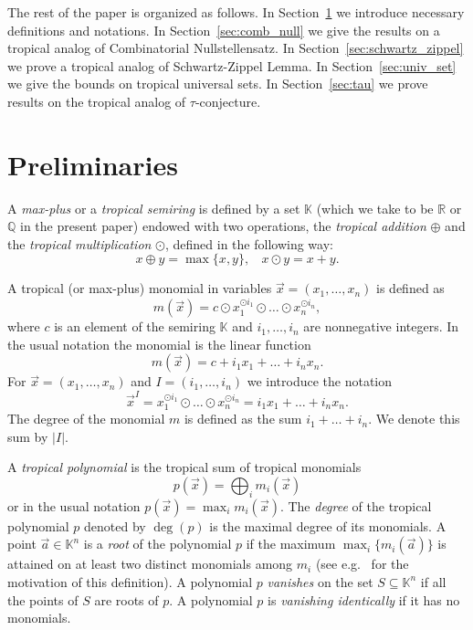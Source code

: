 \documentclass[11pt]{article}
\newcommand{\ta}{\oplus}
\newcommand{\tp}{\odot}
\newcommand{\bb}[1]{\mathbb{#1}}
\begin{document}

The rest of the paper is organized as follows. 
In Section~\ref{sec:prelim} we introduce necessary definitions and notations. 
In Section~\ref{sec:comb_null} we give the results on a tropical analog of Combinatorial Nullstellensatz.
In Section~\ref{sec:schwartz_zippel} we prove a tropical analog of Schwartz-Zippel Lemma. 
In Section~\ref{sec:univ_set} we give the bounds on tropical universal sets. 
In Section~\ref{sec:tau} we prove results on the tropical analog of $\tau$-conjecture.
\section{Preliminaries} \label{sec:prelim}

A \emph{max-plus} or a \emph{tropical semiring} is defined by a set $\bb{K}$ (which we take to be $\mathbb{R}$ or
$\mathbb{Q}$ in the present paper) 
endowed with two operations, the \emph{tropical addition} $\ta$ and the \emph{tropical multiplication} $\tp$, defined in
the following way:
$$
x \ta y = \max\{x,y\}, \ \ \ \ x \tp y = x + y.
$$


A tropical (or max-plus) monomial in variables $\vec{x} = (x_1, \ldots, x_n)$ is defined as
\begin{equation} \label{eq:monomial}
m(\vec{x}) = c \tp x_1^{\tp i_1} \tp \ldots \tp x_n^{\tp i_n},
\end{equation}
where $c$ is an element of the semiring $\bb{K}$ and $i_1, \ldots, i_n$ are nonnegative integers.
In the usual notation the monomial is the linear function
$$
m(\vec{x}) = c + i_1 x_1 + \ldots + i_n x_n.
$$
For $\vec{x} = (x_1, \ldots, x_n)$ and $I = (i_1, \ldots, i_n)$
we introduce the notation
$$
\vec{x}^I = x_1^{\tp i_1} \tp \ldots \tp x_n^{\tp i_n} = i_1 x_1 + \ldots + i_n x_n.
$$
The degree of the monomial $m$ is defined as the sum $i_1 + \ldots + i_n$. We denote this sum by $|I|$.

A \emph{tropical polynomial} is the tropical sum of tropical monomials
$$
p(\vec{x}) = \bigoplus_i m_i(\vec{x})
$$
or in the usual notation $p(\vec{x}) = \max_i m_i(\vec{x})$.
The \emph{degree} of the tropical polynomial $p$ denoted by $\deg(p)$ is the maximal degree of its monomials.
A point $\vec{a} \in \bb{K}^n$ is a \emph{root} of the polynomial $p$ if the maximum $\max_i\{m_i(\vec{a})\}$
is attained on at least two distinct monomials among $m_i$ (see e.g.~\cite{RGST05first_steps} for the motivation of this definition). 
A polynomial $p$ \emph{vanishes} on the set $S \subseteq \bb{K}^n$ if all the points of $S$ are roots of $p$. A polynomial $p$ is \emph{vanishing identically} if it has no monomials.
\end{document}
